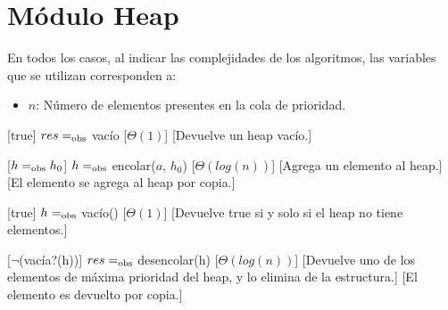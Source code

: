 \section{M\'{o}dulo Heap}

  En todos los casos, al indicar las complejidades de los algoritmos, las variables que se utilizan corresponden a:
  \vspace{-0.5em}\begin{itemize}
    \item $n$: N\'umero de elementos presentes en la cola de prioridad.
  \end{itemize}

\begin{Interfaz}
  
  \begin{paramFormales}
    \paramGeneros{$\alpha$}



  \end{paramFormales}




    [true]
    {$res =_{\mathrm{obs}}$ vac\'{i}o}
    [$\Theta(1)$]
    [Devuelve un heap vac\'io.]

    [$h =_{\mathrm{obs}} h_{0}$]
    {$h =_{\mathrm{obs}}$ encolar($a$, $h_{0}$)}
    [$\Theta(log(n))$]
    [Agrega un elemento al heap.]
    [El elemento se agrega al heap por copia.]

    [true]
    {$h =_{\mathrm{obs}}$ vac\'{i}o()}
    [$\Theta(1)$]
    [Devuelve true si y solo si el heap no tiene elementos.]

    [$\neg$(vac\'ia?(h))]
    {$res =_{\mathrm{obs}}$ desencolar(h)}
    [$\Theta(log(n))$]
    [Devuelve uno de los elementos de m\'axima prioridad del heap, y lo elimina de la estructura.]
    [El elemento es devuelto por copia.]

\end{Interfaz}

